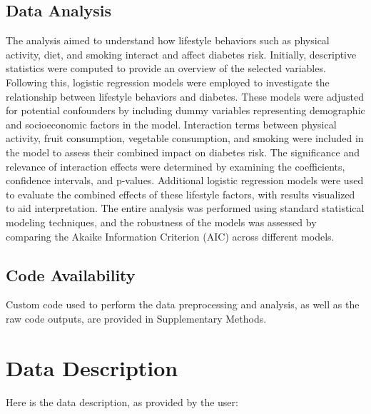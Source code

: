 \documentclass[11pt]{article}
\begin{document}
\subsection*{Data Analysis}
The analysis aimed to understand how lifestyle behaviors such as physical activity, diet, and smoking interact and affect diabetes risk. Initially, descriptive statistics were computed to provide an overview of the selected variables. Following this, logistic regression models were employed to investigate the relationship between lifestyle behaviors and diabetes. These models were adjusted for potential confounders by including dummy variables representing demographic and socioeconomic factors in the model. Interaction terms between physical activity, fruit consumption, vegetable consumption, and smoking were included in the model to assess their combined impact on diabetes risk. The significance and relevance of interaction effects were determined by examining the coefficients, confidence intervals, and p-values. Additional logistic regression models were used to evaluate the combined effects of these lifestyle factors, with results visualized to aid interpretation. The entire analysis was performed using standard statistical modeling techniques, and the robustness of the models was assessed by comparing the Akaike Information Criterion (AIC) across different models.\subsection*{Code Availability}

Custom code used to perform the data preprocessing and analysis, as well as the raw code outputs, are provided in Supplementary Methods.






\clearpage
\appendix

\section{Data Description}
Here is the data description, as provided by the user:
\end{document}
